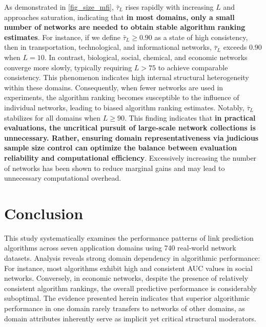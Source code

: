 \documentclass{article}
\begin{document}
 As demonstrated in \autoref{fig_size_mfi}, $\bar{\tau}_{L}$ rises rapidly with increasing $L$ and approaches saturation, indicating that \textbf{in most domains, only a small number of networks are needed to obtain stable algorithm ranking estimates}. For instance, if we define $\bar{\tau}_L \geq 0.90$ as a state of high consistency, then in transportation, technological, and informational networks, $\bar{\tau}_{L}$ exceeds $0.90$ when $L=10$. In contrast, biological, social, chemical, and economic networks converge more slowly, typically requiring $L>75$ to achieve comparable consistency. This phenomenon indicates high internal structural heterogeneity within these domains. Consequently, when fewer networks are used in experiments, the algorithm ranking becomes susceptible to the influence of individual networks, leading to biased algorithm ranking estimates. Notably, $\bar{\tau}_L$ stabilizes for all domains when $L \geq 90$. This finding indicates that \textbf{in practical evaluations, the uncritical pursuit of large-scale network collections is unnecessary. Rather, ensuring domain representativeness via judicious sample size control can optimize the balance between evaluation reliability and computational efficiency}. Excessively increasing the number of networks has been shown to reduce marginal gains and may lead to unnecessary computational overhead.
	
\section{Conclusion}
This study systematically examines the performance patterns of link prediction algorithms across seven application domains using 740 real-world network datasets. Analysis reveals strong domain dependency in algorithmic performance: For instance, most algorithms exhibit high and consistent AUC values in social networks. Conversely, in economic networks, despite the presence of relatively consistent algorithm rankings, the overall predictive performance is considerably suboptimal. The evidence presented herein indicates that superior algorithmic performance in one domain rarely transfers to networks of other domains, as domain attributes inherently serve as implicit yet critical structural moderators.
	
\end{document}

